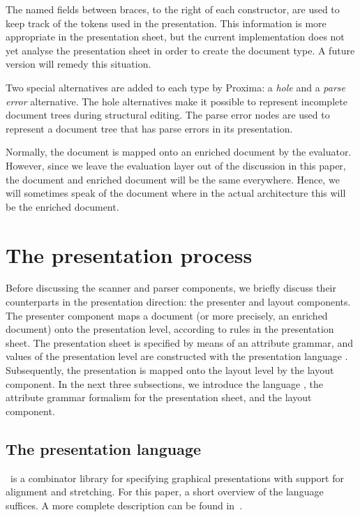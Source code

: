 \documentclass[12pt]{article}
\begin{document}
The named fields between braces, to the right of each constructor, are used to keep track of the tokens used in the presentation. This information is more appropriate in the presentation sheet, but the current implementation does not yet analyse the presentation sheet in order to create the document type. A future version will remedy this situation.

Two special alternatives are added to each type by Proxima: a {\em hole} and a {\em parse error} alternative. The hole alternatives make it possible to represent incomplete document trees during structural editing. The parse error nodes are used to represent a document tree that has parse errors in its presentation.

Normally, the document is mapped onto an enriched document by the evaluator. However, since we leave the evaluation layer out of the discussion in this paper, the document and enriched document will be the same everywhere. Hence, we will sometimes speak of the document where in the actual architecture this will be the enriched document.




%
\section{The presentation process}\label{sect:presentationProcess}
%

Before discussing the scanner and parser components, we briefly discuss their counterparts in the presentation direction: the presenter and layout components. The presenter component maps a document (or more precisely, an enriched document) onto the presentation level, according to rules in the presentation sheet. The presentation sheet is specified by means of an attribute grammar, and values of the presentation level are constructed with the presentation language \Xprez. Subsequently, the presentation is mapped onto the layout level by the layout component. In the next three subsections, we introduce the language \Xprez, the attribute grammar formalism for the presentation sheet, and the layout component.

\subsection{The {\Xprez} presentation language} \label{sect:xprez}

\Xprez\ is a combinator library for specifying graphical presentations with support for alignment and stretching. For this paper, a short overview of the language suffices. A more complete description can be found in~\cite{schrage04Proxima}.
\end{document}
